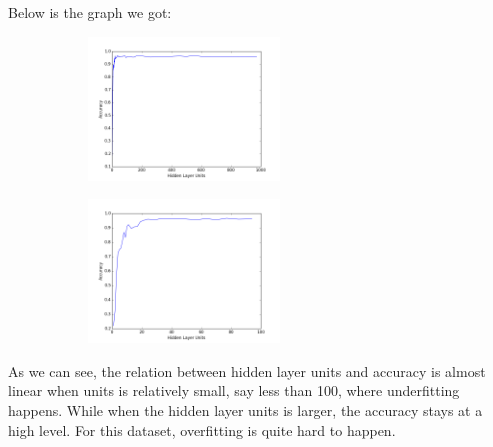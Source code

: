 \documentclass{article}
\begin{document}
Below is the graph we got:
 \begin{figure}[H]
 	\centering
 	\begin{subfigure}{.45\textwidth}
 		\centering
 		\includegraphics[width=2in]{figure/figure_1.png}
 	\end{subfigure}
 	\begin{subfigure}{.45\textwidth}
 		\centering
 		\includegraphics[width=2in]{figure/figure_1_2.png}
 	\end{subfigure}
 \end{figure}
As we can see, the relation between hidden layer units and accuracy is almost linear when units is relatively small, say less than 100, where underfitting happens. While when the hidden layer units is larger, the accuracy stays at a high level. For this dataset, overfitting is quite hard to happen.
\end{document}
